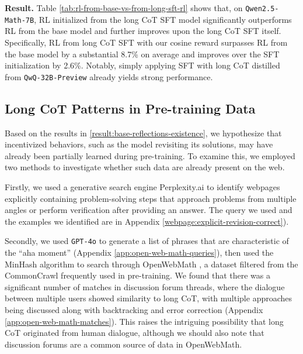 \noindent\textbf{Result.} Table \ref{tab:rl-from-base-vs-from-long-sft-rl} shows that, on \texttt{Qwen2.5-Math-7B}, RL initialized from the long CoT SFT model significantly outperforms RL from the base model and further improves upon the long CoT SFT itself. Specifically, RL from long CoT SFT with our cosine reward surpasses RL from the base model by a substantial 8.7\% on average and improves over the SFT initialization by 2.6\%. Notably, simply applying SFT with long CoT distilled from \texttt{QwQ-32B-Preview} already yields strong performance.



\subsection{Long CoT Patterns in Pre-training Data}
\label{result:base-cot-origin}

Based on the results in \textsection\ref{result:base-reflections-existence}, we hypothesize that incentivized behaviors, such as the model revisiting its solutions, may have already been partially learned during pre-training. To examine this, we employed two methods to investigate whether such data are already present on the web.

Firstly, we used a generative search engine Perplexity.ai to identify webpages explicitly containing problem-solving steps that approach problems from multiple angles or perform verification after providing an answer. The query we used and the examples we identified are in Appendix \ref{webpage:explicit-revision-correct}).

Secondly, we used \texttt{GPT-4o} to generate a list of phrases that are characteristic of the ``aha moment'' (Appendix \ref{app:open-web-math-queries}), then used the MinHash algorithm \cite{666900} to search through  OpenWebMath \cite{paster2023openwebmathopendatasethighquality}, a dataset filtered from the CommonCrawl \cite{cc:Rana:2010:Common-Crawl-open-web-scale-crawl} frequently used in pre-training. We found that there was a significant number of matches in discussion forum threads, where the dialogue between multiple users showed similarity to long CoT, with multiple approaches being discussed along with backtracking and error correction (Appendix \ref{app:open-web-math-matches}). This raises the intriguing possibility that long CoT originated from human dialogue, although we should also note that discussion forums are a common source of data in OpenWebMath.

